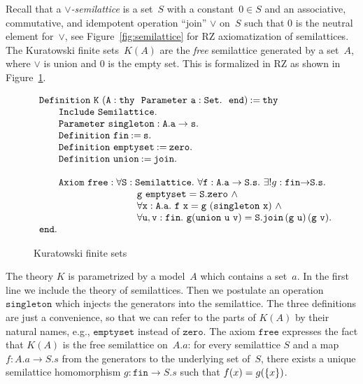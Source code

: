 Recall that a \emph{$\vee$-semilattice} is a set~$S$ with a
constant~$0 \in S$ and an associative, commutative, and idempotent
operation ``join'' $\vee$ on~$S$ such that $0$ is the neutral element
for~$\vee$, see Figure~\ref{fig:semilattice} for RZ axiomatization of
semilattices.
%
The Kuratowski finite sets~$K(A)$ are the \emph{free} semilattice
generated by a set~$A$, where $\vee$ is union and $0$ is the empty
set. This is formalized in RZ as shown in Figure~\ref{fig:kuratowski}.
%
\begin{figure}
\[
\begin{array}{l}
\iDefinition{\texttt{K}\ (\texttt{A} : \mathtt{thy}\ \  \iParameter{\mathtt{a}}{\iSet}.\ \  \texttt{end})}{\mathtt{thy}}\\
\qquad \iInclude{\mathtt{Semilattice}}.\\
\qquad \iParameter{\mathtt{singleton}}{\mathtt{A.a} \to \mathtt{s}}.\\
\qquad \iDefinition{\mathtt{fin}}{\mathtt{s}}.\\
\qquad \iDefinition{\mathtt{emptyset}}{\mathtt{zero}}.\\
\qquad \iDefinition{\mathtt{union}}{\mathtt{join}}.\\
\\
\qquad \iAxiom{\mathtt{free}}{} \forall \mathtt{S}:\mathtt{Semilattice}.\ \forall\mathtt{f}:{\mathtt{A.a}\to\mathtt{S.s}}.\ \exists!g:\mathtt{fin}{\to}{\mathtt{S.s}}.\\
\qquad \qquad \qquad \qquad \qquad \mathtt{g\ emptyset} = \mathtt{S.zero}\ \land\\
\qquad \qquad \qquad \qquad \qquad \forall\mathtt{x}:\mathtt{A.a}.\ \mathtt{f\ x} = \mathtt{g}\ (\mathtt{singleton\ x})\ \land\\
\qquad \qquad \qquad \qquad \qquad \forall\mathtt{u},\mathtt{v}:\mathtt{fin}.\ \mathtt{g}(\mathtt{union\ u\ v}) = \mathtt{S.join}\,(\mathtt{g\ u})\,(\mathtt{g\ v}).\\
\mathtt{end}.
\end{array}
\]
  \caption{Kuratowski finite sets}
  \label{fig:kuratowski}
\end{figure}
%
The theory $K$ is parametrized by a model~$A$ which contains a
set~$a$. In the first line we include the theory of semilattices. Then
we postulate an operation $\mathtt{singleton}$ which injects the
generators into the semilattice. The three definitions are just a
convenience, so that we can refer to the parts of $K(A)$ by their
natural names, e.g., $\mathtt{emptyset}$ instead of $\mathtt{zero}$.
The axiom $\mathtt{free}$ expresses the fact that $K(A)$ is the free
semilattice on~$A.a$: for every semilattice $S$ and a map $f : A.a \to
S.s$ from the generators to the underlying set of~$S$, there exists a
unique semilattice homomorphism $g : \mathtt{fin} \to S.s$ such that
$f(x) = g(\{x\})$.


